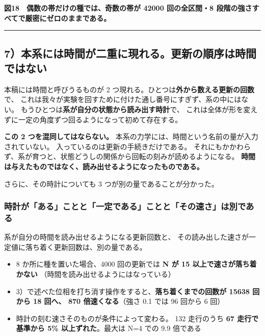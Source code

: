 \documentclass[
]{ltjsarticle}
\providecommand{\tightlist}{%
  \setlength{\itemsep}{0pt}\setlength{\parskip}{0pt}}
\begin{document}
\textbf{図18　偶数の帯だけの種では、奇数の帯が 42000 回の全区間・8
段階の強さすべてで厳密にゼロのままである。}

\begin{center}\rule{0.5\linewidth}{0.5pt}\end{center}

\subsection{7）本系には時間が二重に現れる。更新の順序は時間ではない}\label{ux672cux7cfbux306bux306fux6642ux9593ux304cux4e8cux91cdux306bux73feux308cux308bux66f4ux65b0ux306eux9806ux5e8fux306fux6642ux9593ux3067ux306fux306aux3044}

本稿には時間と呼びうるものが 2
つ現れる。ひとつは\textbf{外から数える更新の回数}で、
これは我々が実験を回すために付けた通し番号にすぎず、系の中にはない。
もうひとつは\textbf{系が自分の状態から読み出す時計}で、
これは全体が形を変えずに一定の角度ずつ回るようになって初めて存在する。

\textbf{この 2 つを混同してはならない。}
本系の力学には、時間という名前の量が入力されていない。
入っているのは更新の手続きだけである。
それにもかかわらず、系が育つと、状態どうしの関係から回転の刻みが読めるようになる。
\textbf{時間は与えたものではなく、読み出せるようになったものである。}

さらに、その時計についても 3 つが別の量であることが分かった。

\subsubsection{時計が「ある」ことと「一定である」ことと「その速さ」は別である}\label{ux6642ux8a08ux304cux3042ux308bux3053ux3068ux3068ux4e00ux5b9aux3067ux3042ux308bux3053ux3068ux3068ux305dux306eux901fux3055ux306fux5225ux3067ux3042ux308b}

系が自分の時間を読み出せるようになる更新回数と、
その読み出した速さが一定値に落ち着く更新回数は、別の量である。

\begin{itemize}
\tightlist
\item
  8 か所に種を置いた場合、4000 回の更新では \textbf{N が 15
  以上で速さが落ち着かない} （時間を読み出せるようにはなっている）
\item
  3）で述べた位相を打ち消す操作をすると、\textbf{落ち着くまでの回数が
  15638 回から 18 回へ、 870 倍速くなる}（強さ 0.1 では 96 回から 6 回）
\item
  時計の刻む速さそのものが条件によって変わる。 132 走行のうち \textbf{67
  走行で基準から 5\% 以上ずれた}。最大は N=4 での 9.9 倍である
\end{itemize}
\end{document}
